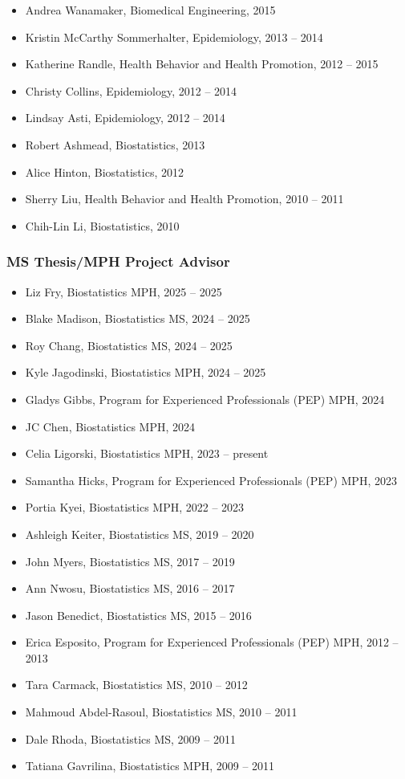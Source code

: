\documentclass[
  english,
  letterpaper,
  DIV=11,
  numbers=noendperiod]{scrartcl}
\providecommand{\tightlist}{%
  \setlength{\itemsep}{0pt}\setlength{\parskip}{0pt}}
\begin{document}
\begin{itemize}
\item
  Andrea Wanamaker, Biomedical Engineering, 2015
\item
  Kristin McCarthy Sommerhalter, Epidemiology, 2013 -- 2014
\item
  Katherine Randle, Health Behavior and Health Promotion, 2012 -- 2015
\item
  Christy Collins, Epidemiology, 2012 -- 2014
\item
  Lindsay Asti, Epidemiology, 2012 -- 2014
\item
  Robert Ashmead, Biostatistics, 2013
\item
  Alice Hinton, Biostatistics, 2012
\item
  Sherry Liu, Health Behavior and Health Promotion, 2010 -- 2011
\item
  Chih-Lin Li, Biostatistics, 2010
\end{itemize}

\subsubsection{MS Thesis/MPH Project
Advisor}\label{ms-thesismph-project-advisor}

\begin{itemize}
\tightlist
\item
  Liz Fry, Biostatistics MPH, 2025 -- 2025
\item
  Blake Madison, Biostatistics MS, 2024 -- 2025
\item
  Roy Chang, Biostatistics MS, 2024 -- 2025
\item
  Kyle Jagodinski, Biostatistics MPH, 2024 -- 2025
\item
  Gladys Gibbs, Program for Experienced Professionals (PEP) MPH, 2024
\item
  JC Chen, Biostatistics MPH, 2024
\item
  Celia Ligorski, Biostatistics MPH, 2023 -- present
\item
  Samantha Hicks, Program for Experienced Professionals (PEP) MPH, 2023
\item
  Portia Kyei, Biostatistics MPH, 2022 -- 2023
\item
  Ashleigh Keiter, Biostatistics MS, 2019 -- 2020
\item
  John Myers, Biostatistics MS, 2017 -- 2019
\item
  Ann Nwosu, Biostatistics MS, 2016 -- 2017
\item
  Jason Benedict, Biostatistics MS, 2015 -- 2016
\item
  Erica Esposito, Program for Experienced Professionals (PEP) MPH, 2012
  -- 2013
\item
  Tara Carmack, Biostatistics MS, 2010 -- 2012
\item
  Mahmoud Abdel-Rasoul, Biostatistics MS, 2010 -- 2011
\item
  Dale Rhoda, Biostatistics MS, 2009 -- 2011
\item
  Tatiana Gavrilina, Biostatistics MPH, 2009 -- 2011
\end{itemize}
\end{document}
